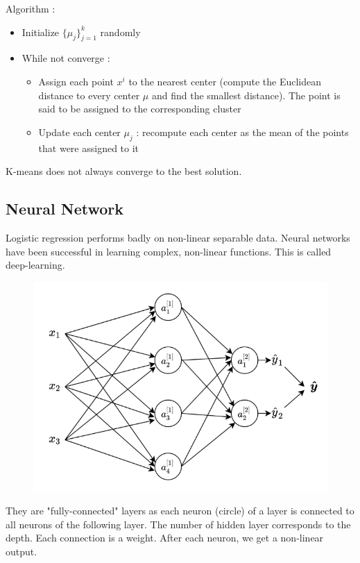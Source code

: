 \documentclass[../main.tex]{subfiles}
\begin{document}
Algorithm : \begin{itemize}
    \item Initialize $\{\mu_j\}_{j=1}^k$ randomly\\
    \item While not converge : \begin{itemize}
        \item Assign each point $x^i$ to the nearest center (compute the Euclidean distance to every center $\mu$ and find the smallest distance). The point is said to be assigned to the corresponding cluster\\
        \item Update each center $\mu_j$ : recompute each center as the mean of the points that were assigned to it\\
    \end{itemize}
\end{itemize}

\warning K-means does not always converge to the best solution.

\subsection{Neural Network}
Logistic regression performs badly on non-linear separable data. Neural networks have been successful in learning complex, non-linear functions. This is called deep-learning.\\

\begin{figure}[hbt!]
    \centering
    \includegraphics[width=.7\textwidth]{IMAGES/opti/Screenshot from 2023-11-20 22-44-45.png}
\end{figure}

They are "fully-connected" layers as each neuron (circle) of a layer is connected to all neurons of the following layer. The number of hidden layer corresponds to the depth. Each connection is a weight. After each neuron, we get a non-linear output.\\
\end{document}
